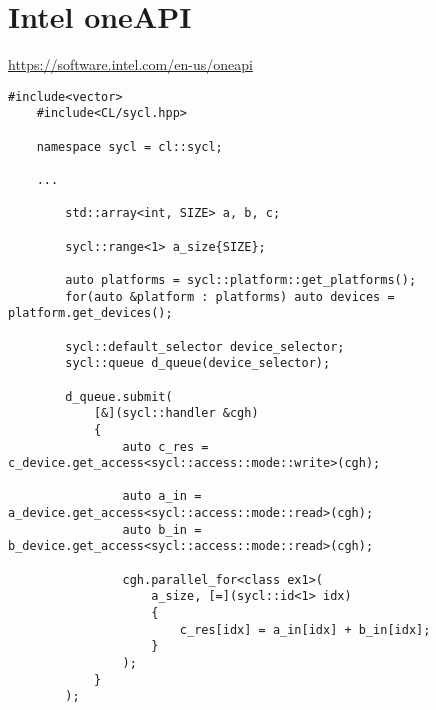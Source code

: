 	\chapter{Intel oneAPI}
	
	\url{https://software.intel.com/en-us/oneapi}
	
	\begin{lstlisting}[caption=oneAPI]
	#include<vector>
	#include<CL/sycl.hpp>

	namespace sycl = cl::sycl;
	
	...

		std::array<int, SIZE> a, b, c;
	
		sycl::range<1> a_size{SIZE};
		
		auto platforms = sycl::platform::get_platforms();
		for(auto &platform : platforms) auto devices = platform.get_devices();
		
		sycl::default_selector device_selector;
		sycl::queue d_queue(device_selector);
		
		d_queue.submit(
			[&](sycl::handler &cgh) 
			{
				auto c_res = c_device.get_access<sycl::access::mode::write>(cgh);

				auto a_in = a_device.get_access<sycl::access::mode::read>(cgh);
				auto b_in = b_device.get_access<sycl::access::mode::read>(cgh);

				cgh.parallel_for<class ex1>(
					a_size, [=](sycl::id<1> idx) 
					{
						c_res[idx] = a_in[idx] + b_in[idx];
					}
				);
			}
		);
		\end{lstlisting}